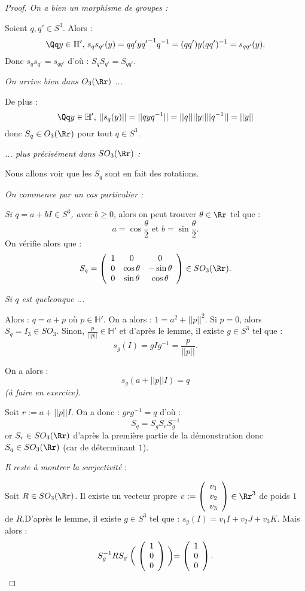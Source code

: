 \documentclass[class=report,crop=false]{standalone}
\newcommand{\exoo}{\emph{(à faire en exercice)}}
\newcommand{\Hh}{\mathbb{H}}
\begin{document}
\begin{proof}
{\it On a bien un morphisme de groupes :}

Soient $q,q'\in S^3$. Alors :
\[\Qq y \in \Hh',\, s_qs_{q'}(y) = qq'y{q'}^{-1} q^{-1} = (qq')y(qq')^{-1} = s_{qq'}(y) .\]
Donc $s_qs_{q'} = s_{qq'}$ d'où : $S_qS_{q'}=S_{qq'}$.

{\it On arrive bien dans $O_3(\Rr)$ ... }

De plus :
\[\Qq y \in \Hh',\, ||s_q(y)|| = ||qyq^{-1}|| = ||q||||y|| ||q^{-1}|| = ||y||\]
donc $S_q \in O_3(\Rr)$ pour tout $q \in S^3$.

{\it ... plus précisément dans $SO_3(\Rr)$ :}

Nous allons voir que les $S_q$ sont en fait des rotations.

{\it On commence par un cas particulier :}

{\it Si $q =a + bI \in S^3$, avec $b \ge 0$}, alors on peut trouver $\theta \in \Rr$ tel que :
\[a = \cos \frac{\theta}{2} \text{ et } b = \sin \frac{\theta}{2} .\]
On vérifie alors que :
\[S_q = \left(\begin{array}{ccc}
1 & 0 & 0\\
0 & \cos \theta & -\sin \theta\\
0 & \sin \theta & \cos \theta
\end{array}\right) \in SO_3(\Rr).\]

{\it Si $q$ est quelconque ...}

Alors : $q =a +p$ où $p \in \Hh'$. On a alors : $1 = a^2 + ||p||^2$. Si $p=0$, alors $S_q=I_3 \in SO_3$. Sinon, $\frac{p}{||p||} \in \Hh '$ et d'après le lemme, il existe $g \in S^3$ tel que :
\[s_g(I) =gIg^{-1} = \frac{p}{||p||} .\]

On a alors :
\[s_g(a+||p||I) = q\]
\exoo. 

Soit $r:=a+||p||I$. On a donc : $grg^{-1} = q$ d'où :
\[S_q=S_gS_rS_g^{-1}\]
or $S_r \in SO_3(\Rr)$ d'après la première partie de la démonstration donc $S_q \in SO_3(\Rr)$ (car de déterminant $1$).

{\it Il reste à montrer la surjectivité }:

Soit $R \in SO_3(\Rr)$. Il existe un vecteur propre $v:=\left(\begin{array}{c}
v_1\\
v_2\\
v_3
\end{array}\right)\in \Rr^3$ de poids $1$ de $R$.D'après le lemme, il existe $g \in S^3$ tel que :
$s_g(I) = v_1I+v_2J+v_3K$. Mais alors :
\[S_g^{-1} RS_g \biggm( \left(\begin{array}{c}
1 \\
0\\
0
\end{array}\right)\biggm) = \left(\begin{array}{c}
1 \\
0\\
0
\end{array}\right) .\]


\end{proof}
\end{document}
